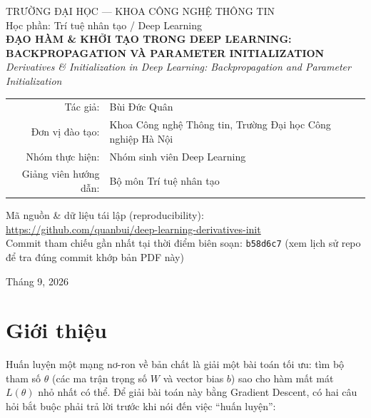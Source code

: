 \documentclass[12pt,a4paper]{article}
\begin{document}
\begin{titlepage}
\centering
\vspace*{1.2cm}
{\large TRƯỜNG ĐẠI HỌC --- KHOA CÔNG NGHỆ THÔNG TIN}\\[0.3cm]
{\large Học phần: Trí tuệ nhân tạo / Deep Learning}\\[2.2cm]

{\Large\bfseries ĐẠO HÀM \& KHỞI TẠO TRONG DEEP LEARNING:}\\[0.4cm]
{\Large\bfseries BACKPROPAGATION VÀ PARAMETER INITIALIZATION}\\[0.6cm]
{\itshape Derivatives \& Initialization in Deep Learning: Backpropagation
and Parameter Initialization}\\[2.0cm]

\begin{tabular}{rl}
Tác giả: & Bùi Đức Quân \\
Đơn vị đào tạo: & Khoa Công nghệ Thông tin, Trường Đại học Công nghiệp Hà Nội \\
Nhóm thực hiện: & Nhóm sinh viên Deep Learning \\
Giảng viên hướng dẫn: & Bộ môn Trí tuệ nhân tạo \\
\end{tabular}

\vspace{1.2cm}
{\small Mã nguồn \& dữ liệu tái lập (reproducibility):\\
\url{https://github.com/quanbui/deep-learning-derivatives-init}\\
Commit tham chiếu gần nhất tại thời điểm biên soạn: \texttt{b58d6c7}
(xem lịch sử repo để tra đúng commit khớp bản PDF này)}

\vfill
{\large Tháng 9, 2026}
\end{titlepage}

\tableofcontents
\newpage
\listoffigures
\listoftables
\newpage

\section{Giới thiệu}

Huấn luyện một mạng nơ-ron về bản chất là giải một bài toán tối ưu: tìm bộ
tham số $\theta$ (các ma trận trọng số $W$ và vector bias $b$) sao cho hàm
mất mát $L(\theta)$ nhỏ nhất có thể. Để giải bài toán này bằng Gradient
Descent, có hai câu hỏi bắt buộc phải trả lời trước khi nói đến việc ``huấn
luyện'':
\end{document}
